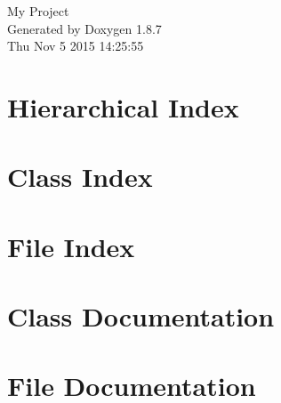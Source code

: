 \documentclass[twoside]{book}
\newcommand{\+}{\discretionary{\mbox{\scriptsize$\hookleftarrow$}}{}{}}
\newcommand{\clearemptydoublepage}{%
  \newpage{\pagestyle{empty}\cleardoublepage}%
}
\begin{document}
\hypersetup{pageanchor=false,
             bookmarks=true,
             bookmarksnumbered=true,
             pdfencoding=unicode
            }
\begin{titlepage}
\vspace*{7cm}
\begin{center}%
{\Large My Project }\\
\vspace*{1cm}
{\large Generated by Doxygen 1.8.7}\\
\vspace*{0.5cm}
{\small Thu Nov 5 2015 14:25:55}\\
\end{center}
\end{titlepage}
\clearemptydoublepage
\tableofcontents
\clearemptydoublepage
{}
\hypersetup{pageanchor=true}

\chapter{Hierarchical Index}

\chapter{Class Index}

\chapter{File Index}

\chapter{Class Documentation}



















\chapter{File Documentation}






























\newpage
{}
{}
\printindex
\end{document}
